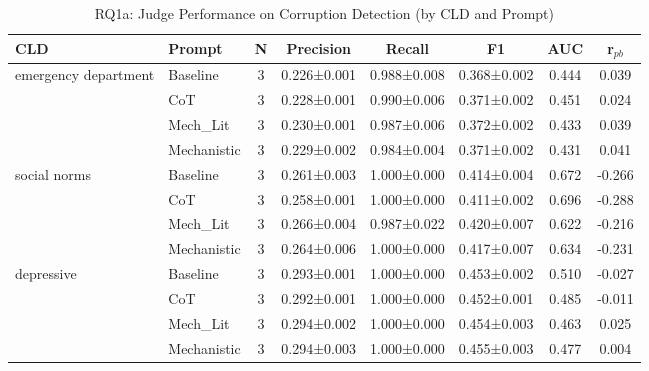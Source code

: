 \begin{table}[htbp]
\centreing
\caption{RQ1a: Judge Performance on Corruption Detection (by CLD and Prompt)}
\label{tab:rq1a_main}
\begin{tabular}{llcccccc}
\toprule
\textbf{CLD} & \textbf{Prompt} & \textbf{N} & \textbf{Precision} & \textbf{Recall} & \textbf{F1} & \textbf{AUC} & \textbf{r$_{pb}$} \\
\midrule
emergency department & Baseline & 3 & 0.226±0.001 & 0.988±0.008 & 0.368±0.002 & 0.444 & 0.039 \\
 & CoT & 3 & 0.228±0.001 & 0.990±0.006 & 0.371±0.002 & 0.451 & 0.024 \\
 & Mech_Lit & 3 & 0.230±0.001 & 0.987±0.006 & 0.372±0.002 & 0.433 & 0.039 \\
 & Mechanistic & 3 & 0.229±0.002 & 0.984±0.004 & 0.371±0.002 & 0.431 & 0.041 \\
\midrule
social norms & Baseline & 3 & 0.261±0.003 & 1.000±0.000 & 0.414±0.004 & 0.672 & -0.266 \\
 & CoT & 3 & 0.258±0.001 & 1.000±0.000 & 0.411±0.002 & 0.696 & -0.288 \\
 & Mech_Lit & 3 & 0.266±0.004 & 0.987±0.022 & 0.420±0.007 & 0.622 & -0.216 \\
 & Mechanistic & 3 & 0.264±0.006 & 1.000±0.000 & 0.417±0.007 & 0.634 & -0.231 \\
\midrule
depressive & Baseline & 3 & 0.293±0.001 & 1.000±0.000 & 0.453±0.002 & 0.510 & -0.027 \\
 & CoT & 3 & 0.292±0.001 & 1.000±0.000 & 0.452±0.001 & 0.485 & -0.011 \\
 & Mech_Lit & 3 & 0.294±0.002 & 1.000±0.000 & 0.454±0.003 & 0.463 & 0.025 \\
 & Mechanistic & 3 & 0.294±0.003 & 1.000±0.000 & 0.455±0.003 & 0.477 & 0.004 \\
\midrule
\bottomrule
\end{tabular}
\end{table}
